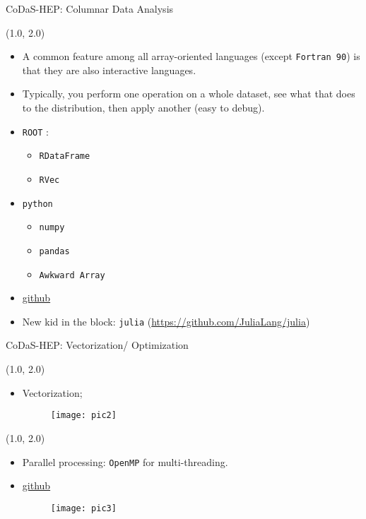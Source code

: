 \documentclass[10pt, xcolor={dvipsnames}, aspectratio = 169]{beamer}
\begin{document}
	\begin{frame}[fragile]{CoDaS-HEP: Columnar Data Analysis}
		\begin{textblock}{14.0}(1.0, 2.0)
			\begin{itemize}
				\item A common feature among all array-oriented languages (except \verb|Fortran 90|) is that they are also interactive languages.
				\item Typically, you perform one operation on a whole dataset, see what that does to the distribution, then apply another (easy to debug).
				\item \verb|ROOT| :
				\begin{itemize}
					\item \verb|RDataFrame|
					\item \verb|RVec|
				\end{itemize}
				\item \verb|python|
				\begin{itemize}
					\item \verb|numpy|
					\item \verb|pandas|
					\item \verb|Awkward Array|
				\end{itemize}
				\item \href{https://github.com/jpivarski-talks/2022-08-03-codas-hep-columnar-tutorial#readme}{github}
				\item New kid in the block: \verb|julia| (\url{https://github.com/JuliaLang/julia})
			\end{itemize}
		\end{textblock}
	\end{frame}

	\begin{frame}[fragile]{CoDaS-HEP: Vectorization/ Optimization}
		\begin{textblock}{14.0}(1.0, 2.0)
			\begin{itemize}
				\item Vectorization;
				\begin{figure}
					\centering
					\texttt{[image: pic2]}
				\end{figure}
			\end{itemize}
		\end{textblock}
	\end{frame}

	\begin{frame}[fragile]
		\begin{textblock}{14.0}(1.0, 2.0)
			\begin{itemize}
				\item Parallel processing: \verb|OpenMP| for multi-threading.
				\item \href{https://github.com/tgmattso/ParProgForPhys}{github}
				\begin{figure}
					\centering
					\texttt{[image: pic3]}
				\end{figure}
			\end{itemize}
		\end{textblock}
	\end{frame}
\end{document}

